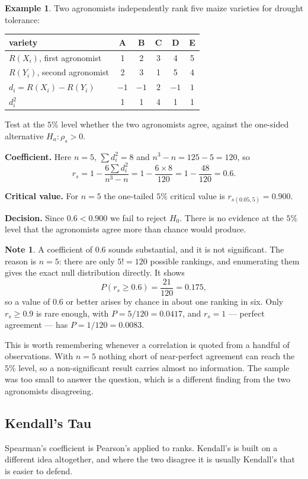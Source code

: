 \documentclass[11pt,a4paper]{article}
\theoremstyle{definition}
\newtheorem{example}[thm]{Example}
\newtheorem{note}[thm]{Note}
\begin{document}
\begin{example}
Two agronomists independently rank five maize varieties for drought tolerance:

\begin{table}[H]
\centering
\begin{tabular}{l|ccccc}
variety & A & B & C & D & E\\
\hline
$R(X_i)$, first agronomist &1&2&3&4&5\\
$R(Y_i)$, second agronomist &2&3&1&5&4\\
$d_i=R(X_i)-R(Y_i)$ &$-1$&$-1$&$2$&$-1$&$1$\\
$d_i^{2}$ &1&1&4&1&1\\
\end{tabular}
\end{table}

Test at the $5\%$ level whether the two agronomists agree, against the one-sided
alternative $H_a:\rho_s>0$.

\textbf{Coefficient.} Here $n=5$, $\sum d_i^{2}=8$ and $n^{3}-n=125-5=120$, so
$$r_s=1-\dfrac{6\sum d_i^{2}}{n^{3}-n}=1-\dfrac{6\times 8}{120}
=1-\dfrac{48}{120}=0.6 .$$

\textbf{Critical value.} For $n=5$ the one-tailed $5\%$ critical value is
$r_{s(0.05,5)}=0.900$.

\textbf{Decision.} Since $0.6<0.900$ we fail to reject $H_0$. There is no evidence
at the $5\%$ level that the agronomists agree more than chance would produce.
\end{example}

\begin{note}
A coefficient of $0.6$ sounds substantial, and it is not significant. The reason is
$n=5$: there are only $5!=120$ possible rankings, and enumerating them gives the
exact null distribution directly. It shows
$$P\left(r_s\geq 0.6\right)=\dfrac{21}{120}=0.175,$$
so a value of $0.6$ or better arises by chance in about one ranking in six. Only
$r_s\geq 0.9$ is rare enough, with $P=5/120=0.0417$, and $r_s=1$ --- perfect
agreement --- has $P=1/120=0.0083$.

This is worth remembering whenever a correlation is quoted from a handful of
observations. With $n=5$ nothing short of near-perfect agreement can reach the
$5\%$ level, so a non-significant result carries almost no information. The
sample was too small to answer the question, which is a different finding from
the two agronomists disagreeing.
\end{note}


\subsection{Kendall's Tau}
Spearman's coefficient is Pearson's applied to ranks. Kendall's is built on a
different idea altogether, and where the two disagree it is usually Kendall's that
is easier to defend.
\end{document}
